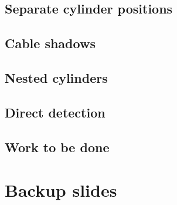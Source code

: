 \documentclass[green, 12pt]{beamer}
\begin{document}
\subsection{Separate cylinder positions}
  
\subsection{Cable shadows}
  
\subsection{Nested cylinders}
  
\subsection{Direct detection}
  

\subsection{Work to be done}
  
  



\appendix
\section{Backup slides}



\end{document}
